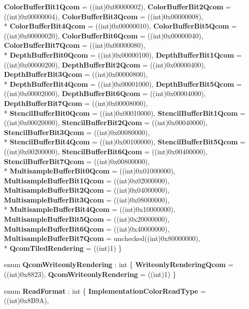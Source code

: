 \begin{DoxyCompactItemize}
{\bfseries Color\-Buffer\-Bit1\-Qcom} = ((int)0x00000002), 
{\bfseries Color\-Buffer\-Bit2\-Qcom} = ((int)0x00000004), 
{\bfseries Color\-Buffer\-Bit3\-Qcom} = ((int)0x00000008), 
\\*
{\bfseries Color\-Buffer\-Bit4\-Qcom} = ((int)0x00000010), 
{\bfseries Color\-Buffer\-Bit5\-Qcom} = ((int)0x00000020), 
{\bfseries Color\-Buffer\-Bit6\-Qcom} = ((int)0x00000040), 
{\bfseries Color\-Buffer\-Bit7\-Qcom} = ((int)0x00000080), 
\\*
{\bfseries Depth\-Buffer\-Bit0\-Qcom} = ((int)0x00000100), 
{\bfseries Depth\-Buffer\-Bit1\-Qcom} = ((int)0x00000200), 
{\bfseries Depth\-Buffer\-Bit2\-Qcom} = ((int)0x00000400), 
{\bfseries Depth\-Buffer\-Bit3\-Qcom} = ((int)0x00000800), 
\\*
{\bfseries Depth\-Buffer\-Bit4\-Qcom} = ((int)0x00001000), 
{\bfseries Depth\-Buffer\-Bit5\-Qcom} = ((int)0x00002000), 
{\bfseries Depth\-Buffer\-Bit6\-Qcom} = ((int)0x00004000), 
{\bfseries Depth\-Buffer\-Bit7\-Qcom} = ((int)0x00008000), 
\\*
{\bfseries Stencil\-Buffer\-Bit0\-Qcom} = ((int)0x00010000), 
{\bfseries Stencil\-Buffer\-Bit1\-Qcom} = ((int)0x00020000), 
{\bfseries Stencil\-Buffer\-Bit2\-Qcom} = ((int)0x00040000), 
{\bfseries Stencil\-Buffer\-Bit3\-Qcom} = ((int)0x00080000), 
\\*
{\bfseries Stencil\-Buffer\-Bit4\-Qcom} = ((int)0x00100000), 
{\bfseries Stencil\-Buffer\-Bit5\-Qcom} = ((int)0x00200000), 
{\bfseries Stencil\-Buffer\-Bit6\-Qcom} = ((int)0x00400000), 
{\bfseries Stencil\-Buffer\-Bit7\-Qcom} = ((int)0x00800000), 
\\*
{\bfseries Multisample\-Buffer\-Bit0\-Qcom} = ((int)0x01000000), 
{\bfseries Multisample\-Buffer\-Bit1\-Qcom} = ((int)0x02000000), 
{\bfseries Multisample\-Buffer\-Bit2\-Qcom} = ((int)0x04000000), 
{\bfseries Multisample\-Buffer\-Bit3\-Qcom} = ((int)0x08000000), 
\\*
{\bfseries Multisample\-Buffer\-Bit4\-Qcom} = ((int)0x10000000), 
{\bfseries Multisample\-Buffer\-Bit5\-Qcom} = ((int)0x20000000), 
{\bfseries Multisample\-Buffer\-Bit6\-Qcom} = ((int)0x40000000), 
{\bfseries Multisample\-Buffer\-Bit7\-Qcom} = unchecked((int)0x80000000), 
\\*
{\bfseries Qcom\-Tiled\-Rendering} = ((int)1)
 \}
\item 
enum {\bfseries Qcom\-Writeonly\-Rendering} \-: int \{ {\bfseries Writeonly\-Rendering\-Qcom} = ((int)0x8823), 
{\bfseries Qcom\-Writeonly\-Rendering} = ((int)1)
 \}
\item 
enum {\bfseries Read\-Format} \-: int \{ {\bfseries Implementation\-Color\-Read\-Type} = ((int)0x8\-B9\-A), 

\end{DoxyCompactItemize}
